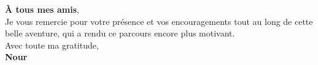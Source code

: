 \begin{center}
\begin{minipage}{0.85\textwidth}
    \textbf{À tous mes amis},\\

    Je vous remercie pour votre présence et vos encouragements tout au long de cette belle aventure, qui a rendu ce parcours encore plus motivant.\\[12pt]

    Avec toute ma gratitude,\\
    \textbf{Nour}

  \end{minipage}
\end{center}

\vspace*{\fill}
\newpage


\vspace*{\fill}

